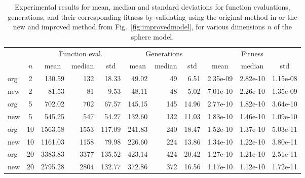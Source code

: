 \documentclass[conference]{IEEEtran}
\begin{document}
\begin{table}[t!] 
\centering
{\renewcommand{\arraystretch}{1.1} \renewcommand{\tabcolsep}{0.05cm} \scriptsize%
\begin{tabularx}{0.99\columnwidth}{| X | c | rrr | rrr| rrr |}
\hline
 & & \multicolumn{3}{c|}{Function eval.} & \multicolumn{3}{c|}{Generations} & \multicolumn{3}{c|}{Fitness} \\ 
     & $n$ & \multicolumn{1}{|c}{mean} & \multicolumn{1}{c}{median} & \multicolumn{1}{c|}{std} & \multicolumn{1}{|c}{mean} & \multicolumn{1}{c}{median} & \multicolumn{1}{c|}{std} & \multicolumn{1}{|c}{mean} & \multicolumn{1}{c}{median} & \multicolumn{1}{c|}{std} \\
\hline
org& 2 & 130.59 & 132 & 18.33 & 49.02 & 49 & 6.51 & 2.35e-09 & 2.82e-10 & 1.15e-08\\ 
new&2 & 81.53 & 81 & 9.53 & 48.11 & 48 & 5.02 & 7.01e-10 & 2.26e-10 & 1.35e-09\\ \hline
org& 5 & 702.02 & 702 & 67.57 & 145.15 & 145 & 14.96 & 2.77e-10 & 1.82e-10 & 3.64e-10\\ 
new& 5 & 545.25 & 547 & 54.27 & 132.60 & 132 & 11.03 & 1.83e-10 & 1.46e-10 & 1.09e-10\\ \hline
org& 10 & 1563.58 & 1553 & 117.09 & 241.83 & 240 & 18.47 & 1.52e-10 & 1.37e-10 & 5.03e-11\\ 
new& 10 & 1161.03 & 1158 & 79.98 & 226.60 & 224 & 13.86 & 1.34e-10 & 1.22e-10 & 3.80e-11\\ \hline
org& 20 & 3383.83 & 3377 & 135.52 & 423.14 & 424 & 20.42 & 1.27e-10 & 1.21e-10 & 2.51e-11\\ 
new& 20 & 2795.28 & 2804 & 132.77 & 372.86 & 372 & 16.56 & 1.17e-10 & 1.12e-10 & 1.72e-11\\ \hline
\end{tabularx}
}
\caption{Experimental results for mean, median and standard deviations for function evaluations, generations, 
and their corresponding fitness by validating using the original method in \cite{Ru06:PPSN} or the new and improved method from Fig.~\ref{fig:improvedmodel}, for various dimensions $n$ of the sphere model.}\label{tbl:Sphere}
\end{table}
\end{document}
